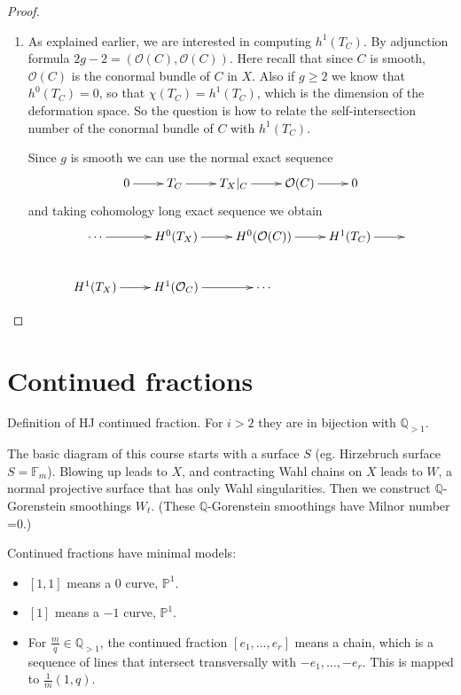 \begin{proof}
\begin{enumerate}
\item As explained earlier, we are interested in computing $h^1(T_C)$. By
adjunction formula $2g-2=(\mathcal{O}(C),\mathcal{O}(C))$.
Here recall that since $C$ is smooth, $\mathcal{O}(C)$ is the conormal bundle of
$C$ in $X$. Also if $g \geq 2$ we know that $h^0(T_C)=0$, so that
$\chi(T_C)=h^1(T_C)$, which is the dimension of the deformation space.
So the question is how to relate the self-intersection number of the conormal
bundle of $C$ with $h^1(T_C)$.

Since $g$ is smooth we can use the normal exact sequence
$$
\xymatrix{
0\ar[r]&T_C\ar[r]&T_X|_{C}\ar[r]&\mathcal{O}(C)\ar[r]&0
}
$$
and taking cohomology long exact sequence we obtain
$$
\xymatrix{
\cdots\ar[r]&H^{0}(T_X)\ar[r]&H^{0}(\mathcal{O}(C))\ar[r]&H^{1}(T_C)\ar[r]&\\
H^{1}(T_X)\ar[r]&H^{1}(\mathcal{O}_C)\ar[r]& \cdots
}
$$

\end{enumerate}
\end{proof}

\section{Continued fractions}
\label{section-continued-fractions}

Definition of HJ continued fraction. For $i>2$ they are in bijection with
$\mathbb{Q}_{>1}$.

The basic diagram of this course starts with a surface $S$ (eg. Hirzebruch
surface $S=\mathbb{F}_m$). Blowing up leads to $X$, and contracting Wahl chains
on $X$ leads to $W$, a normal projective surface that has only Wahl
singularities. Then we construct $\mathbb{Q}$-Gorenstein smoothings $W_t$.
(These  $\mathbb{Q}$-Gorenstein smoothings have Milnor number =0.)

Continued fractions have minimal models:
\begin{itemize}
\item $[1,1]$ means a 0 curve,  $\mathbb{P}^1$.
\item $[1]$ means a  $-1$ curve,  $\mathbb{P}^1$.
\item For $\frac{m}{q}\in\mathbb{Q}_{>1}$, the continued fraction
$[e_1,\ldots,e_r]$ means a chain, which is a sequence of lines that intersect
transversally with $-e_1,\ldots,-e_r$. This is mapped to $\frac{1}{m}(1,q)$.
\end{itemize}

